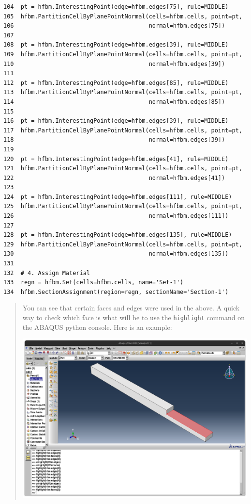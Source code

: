 \documentclass[11pt]{article}
\begin{document}
\begin{enumerate}
\begin{verbatim}
104  pt = hfbm.InterestingPoint(edge=hfbm.edges[75], rule=MIDDLE)
105  hfbm.PartitionCellByPlanePointNormal(cells=hfbm.cells, point=pt,
106                                       normal=hfbm.edges[75])
107  
108  pt = hfbm.InterestingPoint(edge=hfbm.edges[39], rule=MIDDLE)
109  hfbm.PartitionCellByPlanePointNormal(cells=hfbm.cells, point=pt,
110                                       normal=hfbm.edges[39])
111  
112  pt = hfbm.InterestingPoint(edge=hfbm.edges[85], rule=MIDDLE)
113  hfbm.PartitionCellByPlanePointNormal(cells=hfbm.cells, point=pt,
114                                       normal=hfbm.edges[85])
115  
116  pt = hfbm.InterestingPoint(edge=hfbm.edges[39], rule=MIDDLE)
117  hfbm.PartitionCellByPlanePointNormal(cells=hfbm.cells, point=pt,
118                                       normal=hfbm.edges[39])
119  
120  pt = hfbm.InterestingPoint(edge=hfbm.edges[41], rule=MIDDLE)
121  hfbm.PartitionCellByPlanePointNormal(cells=hfbm.cells, point=pt,
122                                       normal=hfbm.edges[41])
123  
124  pt = hfbm.InterestingPoint(edge=hfbm.edges[111], rule=MIDDLE)
125  hfbm.PartitionCellByPlanePointNormal(cells=hfbm.cells, point=pt,
126                                       normal=hfbm.edges[111])
127  
128  pt = hfbm.InterestingPoint(edge=hfbm.edges[135], rule=MIDDLE)
129  hfbm.PartitionCellByPlanePointNormal(cells=hfbm.cells, point=pt,
130                                       normal=hfbm.edges[135])
131  
132  # 4. Assign Material
133  regn = hfbm.Set(cells=hfbm.cells, name='Set-1')
134  hfbm.SectionAssignment(region=regn, sectionName='Section-1')
\end{verbatim}
\end{enumerate}
\begin{quote}
                              \begin{tcolorbox}[colback=osbe-bg,colframe=osbe-fg,title={Scripting note},sharp corners,boxrule=0.4pt]
You can see that certain faces and edges were used in the above.
A quick way to check which face is what will be to use the \texttt{highlight} command on the ABAQUS python console.
Here is an example:
\begin{center}
\includegraphics[width=.9\linewidth]{./figs/highl.png}
\end{center}


               \end{tcolorbox}
\end{quote}
\end{document}
